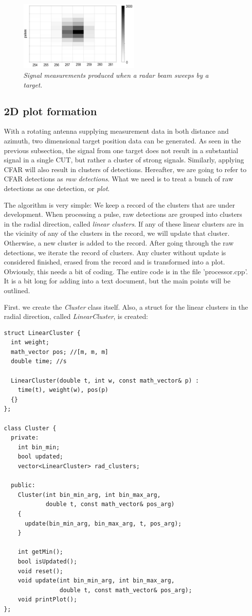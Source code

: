 \documentclass[letterpaper]{book}
\begin{document}
\begin{figure}
  \includegraphics[width=6cm]{det_cluster.png}
  \caption{\textit{Signal measurements produced when a radar beam sweeps by a target.}}
  \label{fig:det_cluster}
\end{figure}


\subsection{2D plot formation}
With a rotating antenna supplying measurement data in both distance and azimuth, two dimensional target position data can be generated. As seen in the previous subsection, the signal from one target does not result in a substantial signal in a single CUT, but rather a cluster of strong signals. Similarly, applying CFAR will also result in clusters of detections. Hereafter, we are going to refer to CFAR detections as \textit{raw detections}. What we need is to treat a bunch of raw detections as one detection, or \textit{plot}. 

The algorithm is very simple: We keep a record of the clusters that are under development. When processing a pulse, raw detections are grouped into clusters in the radial direction, called \textit{linear clusters}. If any of these linear clusters are in the vicinity of any of the clusters in the record, we will update that cluster. Otherwise, a new cluster is added to the record. After going through the raw detections, we iterate the record of clusters. Any cluster without update is considered finished, erased from the record and is transformed into a plot. Obviously, this needs a bit of coding. The entire code is in the file 'processor.cpp'. It is a bit long for adding into a text document, but the main points will be outlined. 

First. we create the \textit{Cluster} class itself. Also, a struct for the linear clusters in the radial direction, called \textit{LinearCluster}, is created:
\begin{lstlisting}
struct LinearCluster {
  int weight;
  math_vector pos; //[m, m, m]
  double time; //s

  LinearCluster(double t, int w, const math_vector& p) :
    time(t), weight(w), pos(p)
  {}
};

class Cluster {
  private:
    int bin_min;
    bool updated;
    vector<LinearCluster> rad_clusters;

  public:
    Cluster(int bin_min_arg, int bin_max_arg, 
            double t, const math_vector& pos_arg) 
    {
      update(bin_min_arg, bin_max_arg, t, pos_arg);    
    }

    int getMin();
    bool isUpdated();
    void reset();
    void update(int bin_min_arg, int bin_max_arg, 
                double t, const math_vector& pos_arg);
    void printPlot();
};
\end{lstlisting}
\end{document}
